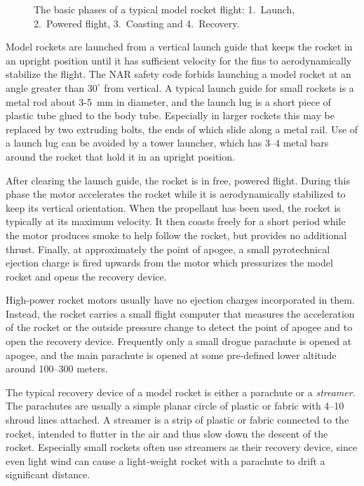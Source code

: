 \begin{figure}
\centering
{}
\caption{The basic phases of a typical model rocket flight:
  1.~Launch, 2.~Powered flight, 3.~Coasting and 4.~Recovery.}
\label{fig-model-flight}
\end{figure}

Model rockets are launched from a vertical launch guide that keeps the
rocket in an upright position until it has sufficient velocity for the
fins to aerodynamically stabilize the flight.  The NAR safety code
forbids launching a model rocket at an angle greater than 
$30^\circ$ from vertical.  A typical launch guide for small rockets is
a metal rod about 3-5~mm in diameter, and the launch lug is a short
piece of plastic tube glued to the body tube.  Especially in 
larger rockets this may be replaced by two extruding bolts, the ends
of which slide along a metal rail.  Use of a launch lug can be avoided
by a tower launcher, which has 3--4 metal bars around the rocket
that hold it in an upright position.

After clearing the launch guide, the rocket is in free, powered flight.
During this phase the motor accelerates the rocket while it is
aerodynamically stabilized to keep its vertical orientation.  When the
propellant has been used, the rocket is typically at its maximum
velocity.  It then coasts freely for a short period while the motor
produces smoke to help follow the rocket, but provides no
additional thrust.  Finally, at approximately the point of apogee, a
small pyrotechnical ejection charge is fired upwards from the motor
which pressurizes the model rocket and opens the recovery device.

High-power rocket motors usually have no ejection charges incorporated
in them.  Instead, the rocket carries a small flight computer that
measures the acceleration of the rocket or the outside pressure change
to detect the point of apogee and to open the recovery device.
Frequently only a small drogue parachute is opened at apogee, and the
main parachute is opened at some pre-defined lower altitude around
100--300 meters.

The typical recovery device of a model rocket is either a parachute or
a {\it streamer}.  The parachutes are usually a simple planar circle
of plastic or fabric with 4--10 shroud lines attached.  A streamer is
a strip of plastic or fabric connected to the rocket, intended to
flutter in the air and thus slow down the descent of the rocket.
Especially small rockets often use streamers as their recovery device,
since even light wind can cause a light-weight rocket with a
parachute to drift a significant distance.




